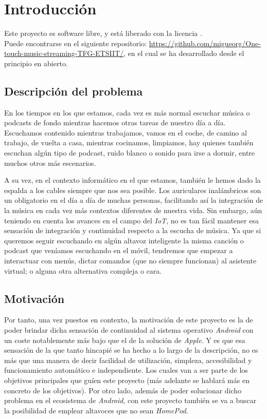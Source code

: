 \chapter{Introducción}

Este proyecto es software libre, y está liberado con la licencia \cite{gplv3}.\\

Puede encontrarse en el siguiente repositorio:
\url{https://github.com/migueorg/One-touch-music-streaming-TFG-ETSIIT/}, en el
cual se ha desarrollado desde el principio en abierto.

\section{Descripción del problema}
En los tiempos en los que estamos, cada vez es más normal escuchar música o
podcasts de fondo mientras hacemos otras tareas de nuestro día a día. Escuchamos
contenido mientras trabajamos, vamos en el coche, de camino al trabajo, de
vuelta a casa, mientras cocinamos, limpiamos, hay quienes también escuchan algún
tipo de podcast, ruido blanco o sonido para irse a dormir, entre muchos otros
más escenarios. 

A su vez, en el contexto informático en el que estamos, también le hemos dado la
espalda a los cables siempre que nos sea posible. Los auriculares inalámbricos
son un obligatorio en el día a día de muchas personas, facilitando así la
integración de la música en cada vez más contextos diferentes de nuestra vida.
Sin embargo, aún teniendo en cuenta los avances en el campo del \emph{IoT}, no
es tan fácil mantener esa sensación de integración y continuidad respecto a la
escucha de música. Ya que si queremos seguir escuchando en algún altavoz
inteligente la misma canción o podcast que veníamos escuchando en el móvil,
tendremos que empezar a interactuar con menús, dictar comandos (que no siempre
funcionan) al asistente virtual; o alguna otra alternativa compleja o cara.\\

\section{Motivación}
Por tanto, una vez puestos en contexto, la motivación de este proyecto es la de
poder brindar dicha sensación de continuidad al sistema operativo \emph{Android}
con un coste notablemente más bajo que el de la solución de \emph{Apple}. Y es
que esa sensación de la que tanto hincapié se ha hecho a lo largo de la
descripción, no es más que una manera de decir facilidad de utilización,
simpleza, accesibilidad y funcionamiento automático e independiente. Los cuales
van a ser parte de los objetivos principales que guíen este proyecto (más
adelante se hablará más en concreto de los objetivos). Por otro lado, además de
poder solucionar dicho problema en el ecosistema de \emph{Android}, con este
proyecto también se va a buscar la posibilidad de emplear altavoces que no sean
\emph{HomePod}. 

